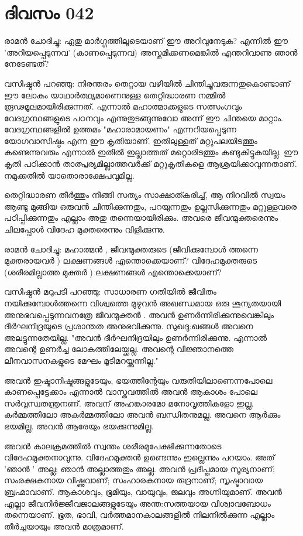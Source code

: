 \newpage
\section{ദിവസം 042}


രാമന്‍ ചോദിച്ചു: ഏതു മാര്‍ഗ്ഗത്തിലൂടെയാണ്‌ ഈ അറിവുനേടുക? എന്നില്‍ ഈ 'അറിയപ്പെടുന്നവ' (കാണപ്പെടുന്നവ) അസ്തമിക്കണമെങ്കില്‍ എന്തറിവാണു ഞാന്‍ നേടേണ്ടത്‌?

വസിഷ്ഠന്‍ പറഞ്ഞു: നിരന്തരം തെറ്റായ വഴിയില്‍ ചിന്തിച്ചുവരുന്നതുകൊണ്ടാണ്‌ ഈ ലോകം  യാഥാർത്ഥ്യമാണെനുള്ള തെറ്റിദ്ധാരണ നമ്മില്‍ രൂഢമൂലമായിരിക്കുന്നത്‌. എന്നാല്‍ മഹാത്മാക്കളുടെ സത്സംഗവും വേദഗ്രന്ഥങ്ങളുടെ പഠനവും എന്നുതുടങ്ങുന്നുവോ അന്ന് ഈ ചിന്തയെ മാറ്റാം. വേദഗ്രന്ഥങ്ങളില്‍ ഉത്തമം "മഹാരാമായണം" എന്നറിയപ്പെടുന്ന യോഗവാസിഷ്ഠം എന്ന ഈ കൃതിയാണ്‌. ഇതിലുള്ളത്‌ മറ്റുപലയിടത്തും കണ്ടെന്നുവരും എന്നാല്‍ ഇതില്‍ ഇല്ലാത്തത്‌ മറ്റൊരിടത്തും കണ്ടുകിട്ടുകയില്ല. ഈ കൃതി പഠിക്കാന്‍ താത്പ്പര്യമില്ലാത്തവര്‍ക്ക്‌ മറ്റുകൃതികളെ ആശ്രയിക്കാവുന്നതാണ്‌. നമുക്കതില്‍ യാതൊരാക്ഷേപവുമില്ല.

തെറ്റിദ്ധാരണ തീര്‍ത്തും നീങ്ങി സത്യം സാക്ഷാത്കരിച്ച്‌, ആ നിറവില്‍ സ്വയം ആണ്ടു മുങ്ങിയ ഒരുവന്‍ ചിന്തിക്കുന്നതും, പറയുന്നതും ഉല്ലസിക്കുന്നതും മറ്റുള്ളവരെ പഠിപ്പിക്കുന്നതും എല്ലാം അതു തന്നെയായിരിക്കും. അവരെ ജീവന്മുക്തരെന്നും ചിലപ്പോള്‍ വിദേഹ മുക്തരെന്നും വിളിക്കുന്നു.

രാമന്‍ ചോദിച്ചു: മഹാത്മന്‍ , ജീവന്മുക്തരുടെ (ജീവിക്കുമ്പോള്‍ ത്തന്നെ മുക്തരായവര്‍ ) ലക്ഷണങ്ങള്‍ എന്തൊക്കെയാണ്‌? വിദേഹമുക്തരുടെ (ശരീരമില്ലാത്ത മുക്തര്‍ )  ലക്ഷണങ്ങള്‍ എന്തൊക്കെയാണ്‌?

വസിഷ്ഠന്‍ മറുപടി പറഞ്ഞു: സാധാരണ ഗതിയില്‍ ജീവിതം നയിക്കുമ്പോള്‍ത്തന്നെ വിശ്വത്തെ മുഴുവന്‍ അഖണ്ഡമായ ഒരു ശൂന്യതയായി അനുഭവപ്പെടുന്നവനത്രേ ജീവന്മുക്തന്‍ . അവന്‍ ഉണര്‍ന്നിരിക്കുന്നുവെങ്കിലും ദീര്‍ഘനിദ്രയുടെ പ്രശാന്തത അനുഭവിക്കുന്നു. സുഖദു:ഖങ്ങള്‍ അവനെ അലട്ടുന്നതേയില്ല. "അവന്‍ ദീര്‍ഘനിദ്രയിലും ഉണര്‍ന്നിരിക്കുന്നു. എന്നാല്‍ അവന്റെ ഉണര്‍ച്ച ലോകത്തിലേയ്ക്കല്ല. അവന്റെ വിജ്ഞാനത്തെ ലീനവാസനകളുടെ മേഘം മൂടിമറയ്ക്കുന്നില്ല."

അവന്‍ ഇഷ്ടാനിഷ്ടങ്ങളുടേയും, ഭയത്തിന്റേയും വരുതിയിലാണെന്നപോലെ കാണപ്പെട്ടേക്കാം എന്നാല്‍ വാസ്തവത്തില്‍ അവന്‍ ആകാശം പോലെ സര്‍വ്വസ്വതന്ത്രനണ്‌. അവന്‌ അഹങ്കാരമോ മനോവൃത്തികളോ ഇല്ല. കര്‍മ്മത്തിലോ അകര്‍മ്മത്തിലോ അവന്‍ ബന്ധിതനുമല്ല. അവനെ ആര്‍ക്കും ഭയമില്ല. അവന്‍ ആരേയും ഭയക്കുന്നുമില്ല. 

അവന്‍ കാലക്രമത്തില്‍ സ്വന്തം ശരീരമുപേക്ഷിക്കുന്നതോടെ വിദേഹമുക്തനാവുന്നു. വിദേഹമുക്തന്‍ ഉണ്ടെന്നും ഇല്ലെന്നും പറയാം. അത്‌  'ഞാന്‍ ' അല്ല; ഞാന്‍ അല്ലാത്തതും അല്ല. അവന്‍ പ്രദീപ്തമായ സൂര്യനാണ്‌; സംരക്ഷകനായ വിഷ്ണുവാണ്‌; സംഹാരകനായ രുദ്രനാണ്‌; സൃഷ്ടാവായ ബ്രഹ്മാവാണ്‌. ആകാശവും, ഭൂമിയും, വായുവും, ജലവും അഗ്നിയുമാണ്‌. അവന്‍ എല്ലാ ജീവനിര്‍ജ്ജീവജാലങ്ങളുടേയും അന്ത:സത്തയായ വിശ്വാവബോധം തന്നെയാണ്‌. ഭൂത, ഭാവി, വര്‍ത്തമാനകാലങ്ങളില്‍ നിലനില്‍ക്കുന്ന എല്ലാം തീര്‍ച്ചയായും അവന്‍ മാത്രമാണ്‌.

